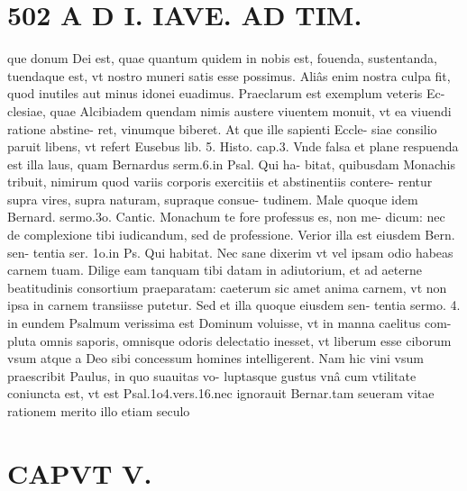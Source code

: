 \documentclass{article}
\begin{document}
\begin{pages}
\section*{502 A D I. IAVE. AD TIM. }\pstart que donum Dei est, quae quantum quidem in nobis est, fouenda, sustentanda, tuendaque est, vt nostro muneri satis esse possimus. Aliâs enim nostra culpa fit, quod inutiles aut minus idonei euadimus. Praeclarum est exemplum veteris Ec- clesiae, quae Alcibiadem quendam nimis austere viuentem monuit, vt ea viuendi ratione abstine- ret, vinumque biberet. At que ille sapienti Eccle- siae consilio paruit libens, vt refert Eusebus lib. 5. Histo. cap.3. Vnde falsa et plane respuenda est illa laus, quam Bernardus serm.6.in Psal. Qui ha- bitat, quibusdam Monachis tribuit, nimirum quod variis corporis exercitiis et abstinentiis contere- rentur supra vires, supra naturam, supraque consue- tudinem. Male quoque idem Bernard. sermo.3o. Cantic. Monachum te fore professus es, non me- dicum: nec de complexione tibi iudicandum, sed de professione. Verior illa est eiusdem Bern. sen- tentia ser. 1o.in Ps. Qui habitat. Nec sane dixerim vt vel ipsam odio habeas carnem tuam. Dilige eam tanquam tibi datam in adiutorium, et ad aeterne beatitudinis consortium praeparatam: caeterum sic amet anima carnem, vt non ipsa in carnem transiisse putetur. Sed et illa quoque eiusdem sen- tentia sermo. 4. in eundem Psalmum verissima est Dominum voluisse, vt in manna caelitus com- pluta omnis saporis, omnisque odoris delectatio inesset, vt liberum esse ciborum vsum atque a Deo sibi concessum homines intelligerent. Nam hic vini vsum praescribit Paulus, in quo suauitas vo- luptasque gustus vnâ cum vtilitate coniuncta est, vt est Psal.1o4.vers.16.nec ignorauit Bernar.tam seueram vitae rationem merito illo etiam seculo  \pend
\section*{CAPVT V. }
\marginpar{[ p.383 ]}\pstart {}
{}

\end{pages}
\end{document}
